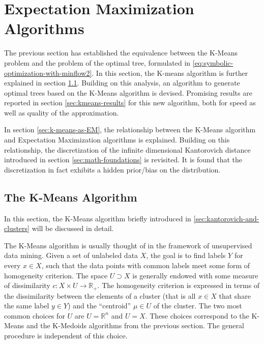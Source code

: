 \section{Expectation Maximization Algorithms}
\label{sec:expect-max-algos}
The previous section has established the equivalence between the K-Means problem and the problem of the optimal tree, formulated in \eqref{eq:symbolic-optimization-with-minflow2}.
In this section, the K-means algorithm is further explained in section \ref{sec:k-means-standard}.
Building on this analysis, an algorithm to generate optimal trees based on the K-Means algorithm is devised.
Promising results are reported in section \ref{sec:kmeans-results} for this new algorithm, both for speed as well as quality of the approximation. 

In section \ref{sec:k-means-as-EM}, the relationship between the K-Means algorithm and Expectation Maximization algorithms is explained.
Building on this relationship, the discretization of the infinite dimensional Kantorovich distance introduced in section \ref{sec:math-foundations} is revisited.
It is found that the discretization in fact exhibits a hidden prior/bias on the distribution.
\subsection{The K-Means Algorithm}
\label{sec:k-means-standard}
In this section, the K-Means algorithm briefly introduced in \ref{sec:kantorovich-and-clusters} will be discussed in detail.

The K-Means algorithm is usually thought of in the framework of unsupervised data mining.
Given a set of unlabeled data $X$, the goal is to find labels $Y$ for every $x\in X$, such that the data points with common labels meet some form of homogeneity criterion.
The space $U\supset X$ is generally endowed with some measure of dissimilarity $c: X\times U\rightarrow \mathbb{R}_+$.
The homogeneity criterion is expressed in terms of the dissimilarity between the elements of a cluster (that is all $x\in X$ that share the same label $y\in Y$) and the ``centroid'' $\mu\in U$ of the cluster.
The two most common choices for $U$ are $U=\mathbb{R}^n$ and  $U=X$.
These choices correspond to the K-Means and the K-Medoids algorithms from the previous section.
The general procedure is independent of this choice.

